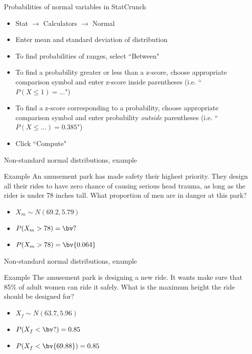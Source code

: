 \documentclass[xcolor=table]{beamer}
\begin{document}
\begin{frame}{Probabilities of normal variables in StatCrunch}
\begin{block}{}
\begin{itemize}
\item Stat $\to$ Calculators $\to$ Normal
\item Enter mean and standard deviation of distribution
\item To find probabilities of ranges, select ``Between"
\item To find a probability greater or less than a z-score, choose appropriate comparison symbol and enter z-score inside parentheses (i.e. ``$P(X \le 1) =\ldots$")
\item To find a z-score corresponding to a probability, choose appropriate comparison symbol and enter probability \emph{outside} parentheses (i.e. ``$P(X \le \ldots) = 0.385$")
\item Click ``Compute"
\end{itemize}
\end{block}
\end{frame}


\begin{frame}{Non-standard normal distributions, example}
\begin{exampleblock}{Example}
An amusement park has made safety their highest priority. They design all their rides to have zero chance of causing serious head trauma, as long as the rider is under 78 inches tall. What proportion of men are in danger at this park?
\begin{itemize}
\pause\item $X_m \sim N(69.2, 5.79)$
\pause\item $P(X_m > 78) = \bv ?$
\pause\item $P(X_m > 78) = \bv{0.064}$
\end{itemize}

\end{exampleblock}
\end{frame}

\begin{frame}{Non-standard normal distributions, example}
\begin{exampleblock}{Example}
The amusement park is designing a new ride. It wants make sure that 85\% of adult women can ride it safely. What is the maximum height the ride should be designed for?
\begin{itemize} 
\pause\item $X_f \sim N(63.7, 5.96)$
\pause\item $P(X_f <  \bv ?) = 0.85$
\pause\item $P(X_f <  \bv{69.88}) = 0.85$
\end{itemize}
\end{exampleblock}
\end{frame}
\end{document}
